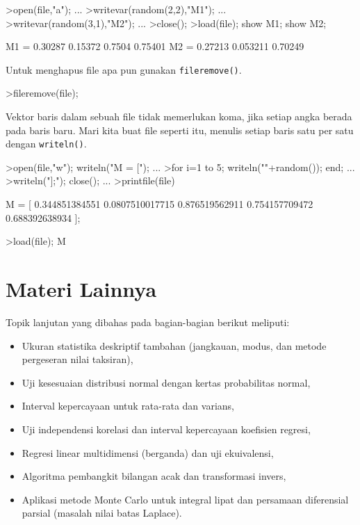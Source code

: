\documentclass[a4paper,11pt,oneside,enabledeprecatedfontcommands]{scrbook}
\newenvironment{eulernotebook}{}{}
\newcommand{\eulerheading}[1]{\chapter{#1}}
\newenvironment{eulercomment}{\par\medskip\noindent}{\par\medskip}
\begin{document}
\begin{eulernotebook}
\begin{eulercomment}
		\end{eulercomment}
		\begin{eulerprompt}
			>open(file,"a"); ...
			>writevar(random(2,2),"M1"); ...
			>writevar(random(3,1),"M2"); ...
			>close();
			>load(file); show M1; show M2;
		\end{eulerprompt}
		\begin{euleroutput}
			M1 = 
			  0.30287   0.15372 
			   0.7504   0.75401 
			M2 = 
			  0.27213 
			 0.053211 
			  0.70249 
		\end{euleroutput}
		\begin{eulercomment}
			Untuk menghapus file apa pun gunakan \texttt{fileremove()}.
		\end{eulercomment}
		\begin{eulerprompt}
			>fileremove(file);
		\end{eulerprompt}
		\begin{eulercomment}
			Vektor baris dalam sebuah file tidak memerlukan koma, jika setiap angka berada pada baris baru. Mari
			kita buat file seperti itu, menulis setiap baris satu per satu dengan \texttt{writeln()}.
		\end{eulercomment}
		\begin{eulerprompt}
			>open(file,"w"); writeln("M = ["); ...
			>for i=1 to 5; writeln(""+random()); end; ...
			>writeln("];"); close(); ...
			>printfile(file)
		\end{eulerprompt}
		\begin{euleroutput}
			M = [
			0.344851384551
			0.0807510017715
			0.876519562911
			0.754157709472
			0.688392638934
			];
		\end{euleroutput}
		\begin{eulerprompt}
			>load(file); M
		\end{eulerprompt}
		\begin{euleroutput}
			[0.34485,  0.080751,  0.87652,  0.75416,  0.68839]
		\end{euleroutput}
		
		\eulerheading{Materi Lainnya}
		\begin{eulercomment}
			Topik lanjutan yang dibahas pada bagian-bagian berikut meliputi:
			\begin{itemize}
				\item Ukuran statistika deskriptif tambahan (jangkauan, modus, dan metode pergeseran nilai taksiran),
				\item Uji kesesuaian distribusi normal dengan kertas probabilitas normal,
				\item Interval kepercayaan untuk rata-rata dan varians,
				\item Uji independensi korelasi dan interval kepercayaan koefisien regresi,
				\item Regresi linear multidimensi (berganda) dan uji ekuivalensi,
				\item Algoritma pembangkit bilangan acak dan transformasi invers,
				\item Aplikasi metode Monte Carlo untuk integral lipat dan persamaan diferensial parsial (masalah nilai batas Laplace).
			\end{itemize}
		\end{eulercomment}
		

\end{eulernotebook}
\end{document}
